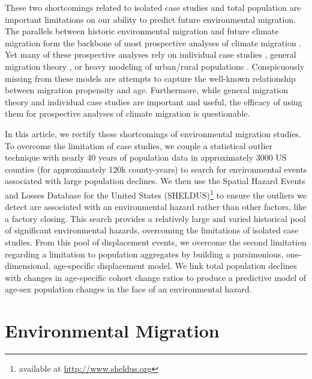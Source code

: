 \documentclass[12pt]{article}
\begin{document}
These two shortcomings related to isolated case studies and total
population are important limitations on our ability to predict future
environmental migration. The parallels between historic environmental
migration and future climate migration form the backbone of most
prospective analyses of climate migration
\citep{rigaud2018groundswell, hauerMigrationInducedSealevel2017, chen2018coastal, xu2020future}.
Yet many of these prospective analyses rely on individual case studies
\citep{chen2018coastal, robinson2020modeling}, general migration theory
\citep{hauerMigrationInducedSealevel2017, bell2021migration}, or heavy
modeling of urban/rural populations
\citep{rigaud2018groundswell, gao2020mapping}. Conspicuously missing
from these models are attempts to capture the well-known relationship
between migration propensity and age. Furthermore, while general
migration theory and individual case studies are important and useful,
the efficacy of using them for prospective analyses of climate migration
is questionable.

In this article, we rectify these shortcomings of environmental
migration studies. To overcome the limitation of case studies, we couple
a statistical outlier \citep{chen1993joint} technique with nearly 40
years of population data in approximately 3000 US counties (for
approximately 120k county-years) to search for environmental events
associated with large population declines. We then use the Spatial
Hazard Events and Losses Database for the United States
(SHELDUS)\footnote{available at \url{http://www.sheldus.org}} to ensure
the outliers we detect are associated with an environmental hazard
rather than other factors, like a factory closing. This search provides
a relatively large and varied historical pool of significant
environmental hazards, overcoming the limitations of isolated case
studies. From this pool of displacement events, we overcome the second
limitation regarding a limitation to population aggregates by building a
parsimonious, one-dimensional, age-specific displacement model. We link
total population declines with changes in age-specific cohort change
ratios to produce a predictive model of age-sex population changes in
the face of an environmental hazard.

\hypertarget{environmental-migration}{%
\section{Environmental Migration}\label{environmental-migration}}
\end{document}
